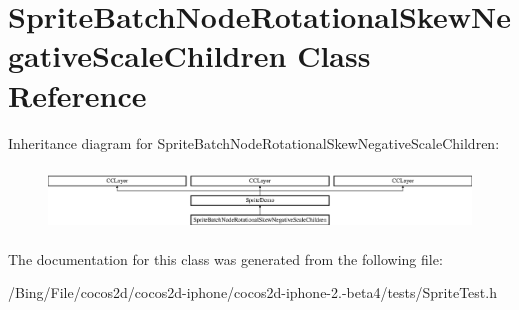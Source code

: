 \hypertarget{interface_sprite_batch_node_rotational_skew_negative_scale_children}{\section{Sprite\-Batch\-Node\-Rotational\-Skew\-Negative\-Scale\-Children Class Reference}
\label{interface_sprite_batch_node_rotational_skew_negative_scale_children}
}
Inheritance diagram for Sprite\-Batch\-Node\-Rotational\-Skew\-Negative\-Scale\-Children\-:\begin{figure}[H]
\begin{center}
\leavevmode
\includegraphics[height=1.696970cm]{interface_sprite_batch_node_rotational_skew_negative_scale_children}
\end{center}
\end{figure}


The documentation for this class was generated from the following file\-:\begin{DoxyCompactItemize}
\item 
/\-Bing/\-File/cocos2d/cocos2d-\/iphone/cocos2d-\/iphone-\/2.-\/beta4/tests/Sprite\-Test.\-h\end{DoxyCompactItemize}
